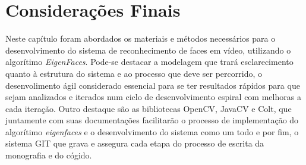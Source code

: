 \section{Considerações Finais}\label{sec:consfin}
Neste capítulo foram abordados os materiais e métodos necessários para o desenvolvimento do sistema de reconhecimento de faces em vídeo, utilizando o algorítimo \textit{EigenFaces}. Pode-se destacar a modelagem que trará esclarecimento quanto à estrutura do sistema e ao processo que deve ser percorrido, o desenvolimento ágil considerado essencial para se ter resultados rápidos para que sejam analizados e iterados num ciclo de desenvolvimento espiral com melhoras a cada iteração. Outro destaque são as bibliotecas OpenCV, JavaCV e Colt, que juntamente com suas documentações facilitarão o processo de implementação do algorítimo \textit{eigenfaces} e o desenvolvimento do sistema como um todo e por fim, o sistema GIT que grava e assegura cada etapa do processo de escrita da monografia e do cógido.







%





